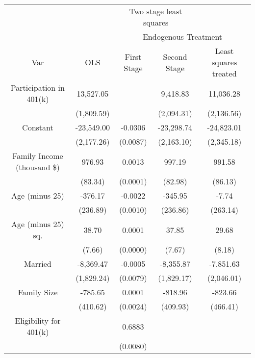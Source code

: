 
\begin{tabular}{ccccc}
\toprule
\multicolumn{2}{c}{ } & \multicolumn{2}{c}{Two stage least squares} \\
\cmidrule(l{3pt}r{3pt}){3-4}
\multicolumn{2}{c}{ } & \multicolumn{3}{c}{Endogenous Treatment} \\
\cmidrule(l{3pt}r{3pt}){3-5}
Var & OLS & First Stage & Second Stage & Least squares treated\\
\midrule
Participation in 401(k) & 13,527.05 &  & 9,418.83 & 11,036.28\\
 & (1,809.59) &  & (2,094.31) & (2,136.56)\\
Constant & -23,549.00 & -0.0306 & -23,298.74 & -24,823.01\\
 & (2,177.26) & (0.0087) & (2,163.10) & (2,345.18)\\
Family Income (thousand \$) & 976.93 & 0.0013 & 997.19 & 991.58\\
 & (83.34) & (0.0001) & (82.98) & (86.13)\\
Age (minus 25) & -376.17 & -0.0022 & -345.95 & -7.74\\
 & (236.89) & (0.0010) & (236.86) & (263.14)\\
Age (minus 25) sq. & 38.70 & 0.0001 & 37.85 & 29.68\\
 & (7.66) & (0.0000) & (7.67) & (8.18)\\
Married & -8,369.47 & -0.0005 & -8,355.87 & -7,851.63\\
 & (1,829.24) & (0.0079) & (1,829.17) & (2,046.01)\\
Family Size & -785.65 & 0.0001 & -818.96 & -823.66\\
 & (410.62) & (0.0024) & (409.93) & (466.41)\\
Eligibility for 401(k) &  & 0.6883 &  & \\
 &  & (0.0080) &  & \\
\bottomrule
\end{tabular}
